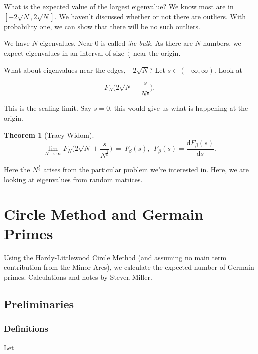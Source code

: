 \documentclass[12pt,letterpaper]{report}
\newcommand\be{\begin{equation}}
\newcommand\ee{\end{equation}}
\newtheorem{thm}{Theorem}[section]
\begin{document}
What is the expected value of the largest eigenvalue? We know most
are in  $[-2\sqrt{N},2\sqrt{N}]$. We haven't discussed whether or
not there are outliers. With probability one, we can show that
there will be no such outliers.

We have $N$ eigenvalues. Near $0$ is called \emph{the bulk}. As
there are $N$ numbers, we expect eigenvalues in an interval of
size $\frac{1}{N}$ near the origin.

What about eigenvalues near the edges, $\pm 2 \sqrt{N}$? Let $s
\in (-\infty,\infty)$. Look at

\be F_N\Big( 2 \sqrt{N} + \frac{s}{N^{\frac{1}{6}}}\Big). \ee

This is the scaling limit. Say $s = 0$. this would give us what is
happening at the origin.

\begin{thm}[Tracy-Widom]

\be \lim_{N\to \infty} F_N\Big( 2 \sqrt{N} +
\frac{s}{N^{\frac{1}{6}}}\Big) \ = \ F_\beta(s), \ \ F_\beta(s) =
\frac{\text{d}F_\beta(s)}{\text{d}s}. \ee

\end{thm}

Here the $N^{\frac{1}{6}}$ arises from the particular problem
we're interested in. Here, we are looking at eigenvalues from
random matrices.



\chapter{Circle Method and Germain Primes}

Using the Hardy-Littlewood Circle Method (and assuming no main
term contribution from the Minor Arcs), we calculate the expected
number of Germain primes. Calculations and notes by Steven Miller.



\section{Preliminaries}

\subsection{Definitions}

Let
\end{document}

